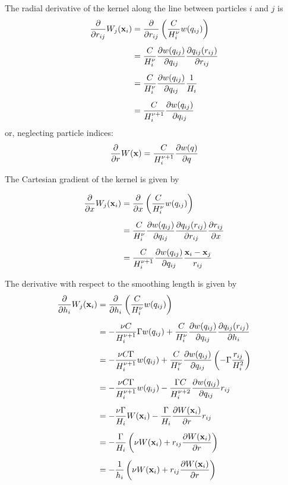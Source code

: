 The radial derivative of the kernel along the line between particles $i$ and $j$ is
%
\begin{align}
	\frac{\partial}{\partial r_{ij}} W_j (\mathbf{x}_i) 	
			&= \frac{\partial}{\partial r_{ij}} \left( \frac{C}{H_i^\nu} w ( q_{ij} )	\right)	\nonumber \\[.5em]
			&= \frac{C}{H_i^\nu} \frac{\partial w(q_{ij})}{\partial q_{ij}} \frac{\partial q_{ij}(r_{ij})}{\partial r_{ij}} 	\nonumber \\[.5em]
			&= \frac{C}{H_i^\nu} \frac{\partial w(q_{ij})}{\partial q_{ij}} \frac{1}{H_i} 	\nonumber \\[.5em]
			&= \frac{C}{H_i^{\nu + 1}} \frac{\partial w(q_{ij})}{\partial q_{ij}}  \label{eq:kernel-dWdr-with-indices}
\end{align}
or, neglecting particle indices:
\begin{align}
	\frac{\partial}{\partial r} W (\mathbf{x}) = \frac{C}{H_i^{\nu + 1}} \frac{\partial w(q)}{\partial q} \label{eq:kernel-dWdr}
\end{align}




The Cartesian gradient of the kernel is given by

\begin{align}
	\frac{\partial}{\partial x} W_j (\mathbf{x}_i) 	
			&= \frac{\partial}{\partial x} \left( \frac{C}{H_i^\nu} w ( q_{ij} )	\right)	\nonumber \\[.5em]
			&= \frac{C}{H_i^\nu} \frac{\partial w(q_{ij})}{\partial q_{ij}} \frac{\partial q_{ij}(r_{ij})}{\partial r_{ij}} \frac{\partial r_{ij}}{\partial x} \nonumber \\[.5em]
			&= \frac{C}{H_i^{\nu + 1}} \frac{\partial w(q_{ij})}{\partial q_{ij}}  \frac{\mathbf{x}_i - \mathbf{x}_j}{r_{ij}} 	\label{grad_kernel_final}
\end{align}



The derivative with respect to the smoothing length is given by
\begin{align}
	\frac{\partial}{\partial h_{i}} W_j (\mathbf{x}_i) 	
			&= \frac{\partial}{\partial h_{i}} \left( \frac{C}{H_i^\nu} w ( q_{ij} )	\right)	\nonumber \\[.5em]
			&= -\frac{\nu C }{H_i^{\nu + 1}} \Gamma w(q_{ij})
				+ \frac{C}{H_i^\nu} \frac{\partial w(q_{ij})}{\partial q_{ij}} \frac{\partial q_{ij}(r_{ij})}{\partial h_{i}} 	\nonumber\\[.5em]
			&= -\frac{\nu C \Gamma}{H_i^{\nu + 1}} w(q_{ij})
				+\frac{C}{H_i^\nu} \frac{\partial w(q_{ij})}{\partial q_{ij}} \left( - \Gamma \frac{r_{ij}}{H_i^2} \right) 	\nonumber\\[.5em]
			&= -\frac{\nu C \Gamma}{H_i^{\nu + 1}} w(q_{ij})
				-\frac{\Gamma C}{H_i^{\nu + 2}} \frac{\partial w(q_{ij})}{\partial q_{ij}} r_{ij} 	\nonumber\\[.5em]
			&= - \frac{\nu \Gamma}{H_i} W(\mathbf{x}_i) - \frac{\Gamma}{H_i} \frac{\partial W(\mathbf{x}_i)}{\partial r}  r_{ij} \nonumber \\[.5em]
			&= - \frac{\Gamma}{H_i} \left( \nu W(\mathbf{x}_i) + r_{ij}  \frac{\partial W(\mathbf{x}_i)}{\partial r} \right) \nonumber \\[.5em]
			&= - \frac{1}{h_i} \left( \nu W(\mathbf{x}_i) + r_{ij}  \frac{\partial W(\mathbf{x}_i)}{\partial r} \right) 
			 \label{eq:kernel-dWdh}
\end{align}








